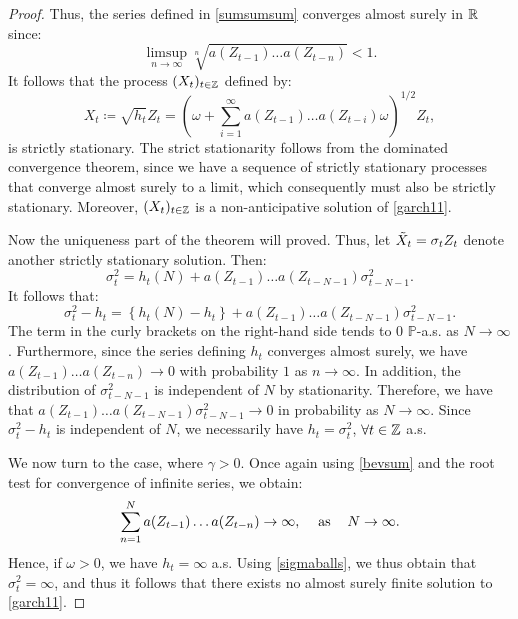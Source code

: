\begin{proof}
Thus, the series defined in \eqref{sumsumsum} converges almost surely in $\mathbb{R}$ since:
\begin{equation*}
    \limsup_{n\to\infty}\sqrt[n]{a(Z_{t-1})\dots a(Z_{t-n})}<1.
\end{equation*}
It follows that the process $(X_{t})_{t\in\mathbb{Z}}$ defined by:
\begin{equation}
    X_{t}\coloneqq \sqrt{h_{t}}Z_{t}=\left(\omega+\sum_{i=1}^{\infty}a(Z_{t-1})\dots a(Z_{t-i})\omega\right)^{1/2}Z_{t},
\end{equation}
is strictly stationary. The strict stationarity follows from the dominated convergence theorem, since we have a sequence of strictly stationary processes that converge almost surely to a limit, which consequently must also be strictly stationary. 
Moreover, $(X_{t})_{t\in\mathbb{Z}}$ is a non-anticipative solution of \eqref{garch11}.


Now the uniqueness part of the theorem will proved. Thus, let $\Tilde{X}_{t}=\sigma_{t}Z_{t}$ denote another strictly stationary solution. Then:
\begin{equation}
    \sigma_{t}^{2}=h_{t}(N)+ a(Z_{t-1})\dots a(Z_{t-N-1})\sigma_{t-N-1}^{2}.
\end{equation}
It follows that:
\begin{equation}
    \sigma_{t}^{2}-h_{t}=\left\{h_{t}(N)-h_{t}\right\}+a(Z_{t-1})\dots a(Z_{t-N-1})\sigma_{t-N-1}^{2}.
\end{equation}
The term in the curly brackets on the right-hand side tends to $0$ $\mathbb{P}$-a.s. as $N\to\infty$. Furthermore, since the series defining $h_{t}$ converges almost surely, we have $a(Z_{t-1})\dots a(Z_{t-n})\to 0$ with probability $1$ as $n\to\infty$. In addition, the distribution of $\sigma_{t-N-1}^{2}$ is independent of $N$ by stationarity. Therefore, we have that $a(Z_{t-1})\dots a(Z_{t-N-1})\sigma_{t-N-1}^{2}\to 0$ in probability as $N\to \infty$. Since $\sigma_{t}^{2}-h_{t}$ is independent of $N$, we necessarily have $h_{t}=\sigma_{t}^{2}$, $\forall t\in \mathbb{Z}$ a.s.

We now turn to the case, where $\gamma>0$. Once again using \eqref{bevsum} and the root test for convergence of infinite series, we obtain:
\begin{equation}
    \sum_{n=1}^{N}a(Z_{t-1})\dots a(Z_{t-n})\to \infty, \hspace{12 pt}\textrm{as}\hspace{12 pt} N\to\infty.
\end{equation}
Hence, if $\omega>0$, we have $h_{t}=\infty$ a.s. Using \eqref{sigmaballs}, we thus obtain that $\sigma_{t}^{2}=\infty$, and thus it follows that there exists no almost surely finite solution to \eqref{garch11}.


\end{proof}
